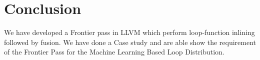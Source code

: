 





\section{Conclusion}\label{sec:distribution:conclusion}
We have developed a Frontier pass in LLVM which perform loop-function inlining followed by fusion. We have done a Case study and are able show the requirement of the Frontier Pass for the Machine Learning Based Loop Distribution. 